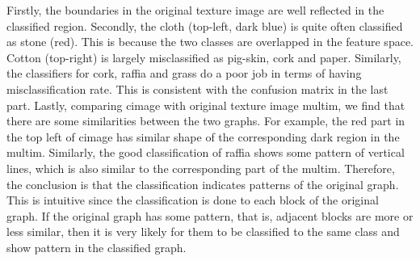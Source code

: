 \label{sec:image}
Firstly, the boundaries in the original texture image are well reflected in the classified region. 
Secondly, the cloth (top-left, dark blue) is quite often classified as stone (red). This is because the two classes are overlapped in the feature space. Cotton (top-right) is largely misclassified as pig-skin, cork and paper. Similarly, the classifiers for cork, raffia and grass do a poor job in terms of having misclassification rate. This is consistent with the confusion matrix in the last part.
Lastly, comparing cimage with original texture image multim, we find that there are some similarities between the two graphs. For example, the red part in the top left of cimage has similar shape of the corresponding dark region in the multim. Similarly, the good classification of raffia shows some pattern of vertical lines, which is also similar to the corresponding part of the multim. Therefore, the conclusion is that the classification indicates patterns of the original graph. This is intuitive since the classification is done to each block of the original graph. If the original graph has some pattern, that is, adjacent blocks are more or less similar, then it is very likely for them to be classified to the same class and show pattern in the classified graph.